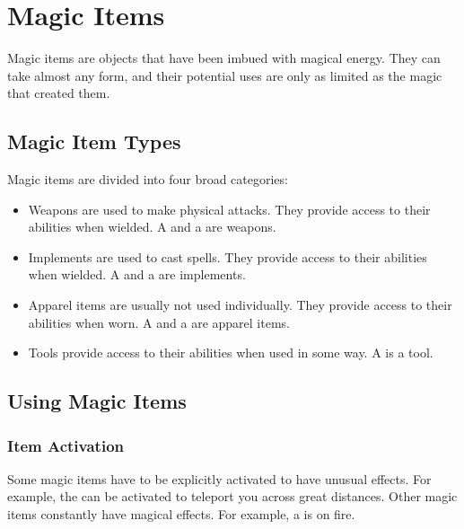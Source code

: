 \chapter{Magic Items}

Magic items are objects that have been imbued with magical energy. They can take almost any form, and their potential uses are only as limited as the magic that created them.

\section{Magic Item Types}
    Magic items are divided into four broad categories:
    \begin{itemize}
        \item Weapons are used to make physical attacks. They provide access to their abilities when wielded.
            A  and a  are weapons.
        \item Implements are used to cast spells. They provide access to their abilities when wielded.
            A  and a  are implements.
        \item Apparel items are usually not used individually. They provide access to their abilities when worn.
            A  and a  are apparel items.
        \item Tools provide access to their abilities when used in some way.
            A  is a tool.
    \end{itemize}

\section{Using Magic Items}

    \subsection{Item Activation}

        Some magic items have to be explicitly activated to have unusual effects.
        For example, the  can be activated to teleport you across great distances.
        Other magic items constantly have magical effects.
        For example, a  is on fire.

